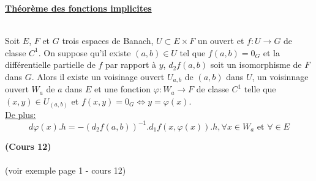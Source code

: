 \documentclass[12pt,a4paper]{article}
\begin{document}
\begin{flushleft}
\underline{\textbf{Théorème des fonctions implicites}}\\~\\

\begin{thm}
Soit $E$, $F$ et $G$ trois espaces de Banach, $U \subset E \times F$ un ouvert et $f: U \longrightarrow G$ de classe $C^1$. On suppose qu'il existe $(a,b) \in U$ tel que $f(a,b) = 0_G$ et la différentielle partielle de $f$ par rapport à $y$, $d_2f(a,b)$ soit un isomorphisme de $F$ dans $G$. Alors il existe un voisinage ouvert $U_{a,b}$ de $(a,b)$ dans $U$, un voisinnage ouvert $W_a$ de $a$ dans $E$ et une fonction $\varphi :W_a \longrightarrow F$ de classe $C^1$ telle que $(x,y) \in U_{(a,b)}$ et $f(x,y)=0_G \Leftrightarrow y = \varphi (x)$.\\
\underline{De plus:} $$d\varphi(x) . h = -(d_2f(a,b))^{-1} . d_1f(x, \varphi (x) ) . h, \forall x \in W_a \text{ et } \forall \in E$$
\end{thm}

\textbf{(Cours 12)}\\~\\


(voir exemple page 1 - cours 12)






























\end{flushleft}
\end{document}
